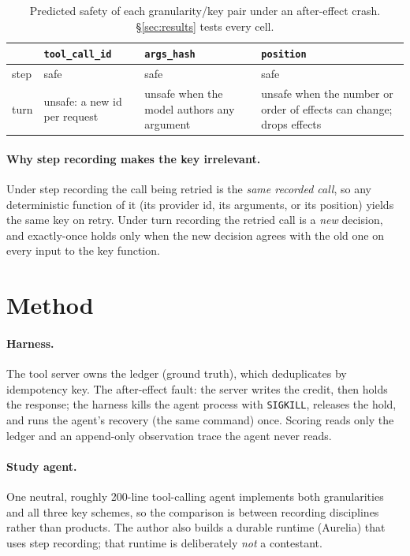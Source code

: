 \documentclass[11pt]{article}
\begin{document}
\begin{table}[t]
\centering
\begin{tabularx}{\linewidth}{lXXX}
\toprule
 & \texttt{tool\_call\_id} & \texttt{args\_hash} & \texttt{position} \\
\midrule
step & safe & safe & safe \\
turn & unsafe: a new id per request & unsafe when the model authors any argument
     & unsafe when the number or order of effects can change; drops effects \\
\bottomrule
\end{tabularx}
\caption{Predicted safety of each granularity/key pair under an after-effect
crash. \S\ref{sec:results} tests every cell.}
\label{tab:taxonomy}
\end{table}

\paragraph{Why step recording makes the key irrelevant.} Under step recording
the call being retried is the \emph{same recorded call}, so any deterministic
function of it (its provider id, its arguments, or its position) yields the
same key on retry. Under turn recording the retried call is a \emph{new}
decision, and exactly-once holds only when the new decision agrees with the
old one on every input to the key function.

\section{Method}
\label{sec:method}

\paragraph{Harness.} The tool server owns the ledger (ground truth), which
deduplicates by idempotency key. The after-effect fault: the server writes
the credit, then holds the response; the harness kills the agent process
with \texttt{SIGKILL}, releases the hold, and runs the agent's recovery (the
same command) once. Scoring reads only the ledger and an append-only
observation trace the agent never reads.

\paragraph{Study agent.} One neutral, roughly 200-line tool-calling agent
implements both granularities and all three key schemes, so the comparison is
between recording disciplines rather than products. The author also builds a
durable runtime (Aurelia) that uses step recording; that runtime is
deliberately \emph{not} a contestant.
\end{document}
